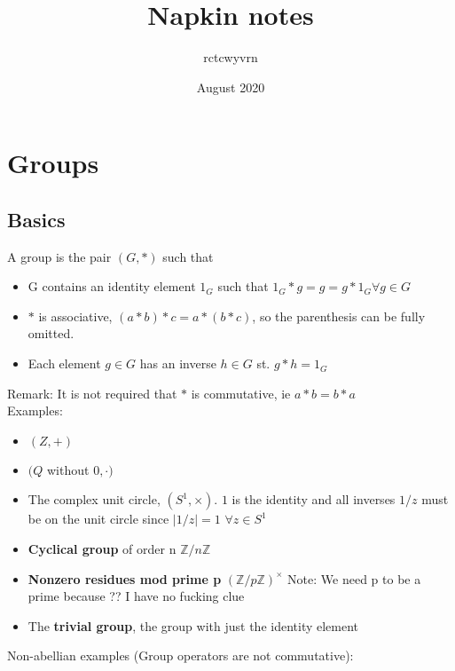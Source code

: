\documentclass{article}
\title{Napkin notes}
\author{rctcwyvrn}
\date{August 2020}
\begin{document}
\maketitle


\section{Groups}
\subsection{Basics}
A group is the pair $(G,*)$ such that
\begin{itemize}
    \item G contains an identity element $1_G$ such that $1_G * g = g = g * 1_G \forall g \in G$
    \item $*$ is associative, $(a*b)*c = a*(b*c)$, so the parenthesis can be fully omitted.
    \item Each element $g\in G$ has an inverse $h\in G$ st. $g*h = 1_G$
\end{itemize}
Remark: It is not required that $*$ is commutative, ie $a*b = b*a$ \\
\newline
Examples: 
\begin{itemize}
    \item $(Z,+)$
    \item $(Q$ without $0, \cdot)$
    \item The complex unit circle, $(S^1,\times)$. $1$ is the identity and all inverses $1/z$ must be on the unit circle since $|1/z| = 1$ $\forall z \in S^1$
    \item \textbf{Cyclical group} of order n $\mathbb{Z}/n\mathbb{Z}$
    \item \textbf{Nonzero residues mod prime p} $(\mathbb{Z}/p\mathbb{Z})^\times$ \newline \textbullet  Note: We need p to be a prime because ?? I have no fucking clue
    \item The \textbf{trivial group}, the group with just the identity element
\end{itemize}
Non-abellian examples (Group operators are not commutative):
\end{document}
